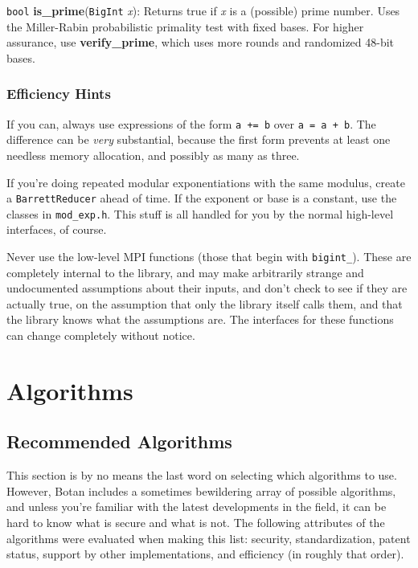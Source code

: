\documentclass{article}
\newcommand{\filename}[1]{\texttt{#1}}
\newcommand{\function}[1]{\textbf{#1}}
\newcommand{\type}[1]{\texttt{#1}}
\renewcommand{\arg}[1]{\textsl{#1}}
\begin{document}
\type{bool} \function{is\_prime}(\type{BigInt} \arg{x}): Returns true if
\arg{x} is a (possible) prime number. Uses the Miller-Rabin probabilistic
primality test with fixed bases. For higher assurance, use
\function{verify\_prime}, which uses more rounds and randomized 48-bit bases.

\subsubsection{Efficiency Hints}

If you can, always use expressions of the form \verb|a += b| over
\verb|a = a + b|. The difference can be \emph{very} substantial, because the
first form prevents at least one needless memory allocation, and possibly as
many as three.

If you're doing repeated modular exponentiations with the same modulus, create
a \type{BarrettReducer} ahead of time. If the exponent or base is a constant,
use the classes in \filename{mod\_exp.h}. This stuff is all handled for you by
the normal high-level interfaces, of course.

Never use the low-level MPI functions (those that begin with
\texttt{bigint\_}). These are completely internal to the library, and
may make arbitrarily strange and undocumented assumptions about their
inputs, and don't check to see if they are actually true, on the
assumption that only the library itself calls them, and that the
library knows what the assumptions are. The interfaces for these
functions can change completely without notice.

\pagebreak
\section{Algorithms}

\subsection{Recommended Algorithms}

This section is by no means the last word on selecting which algorithms to use.
However, Botan includes a sometimes bewildering array of possible algorithms,
and unless you're familiar with the latest developments in the field, it can be
hard to know what is secure and what is not. The following attributes of the
algorithms were evaluated when making this list: security, standardization,
patent status, support by other implementations, and efficiency (in roughly
that order).
\end{document}
